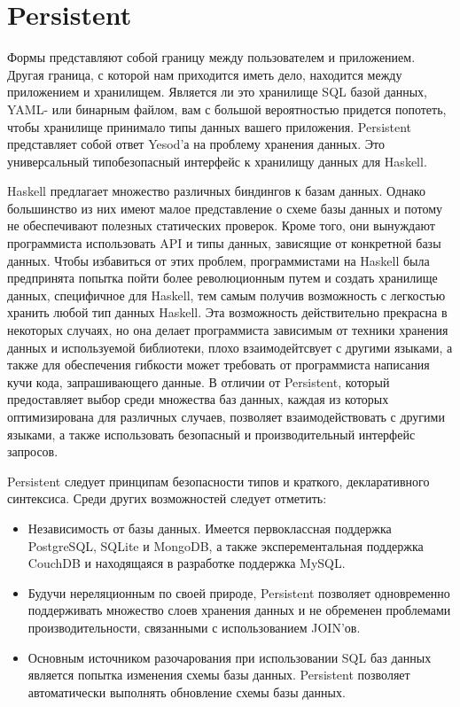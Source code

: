 \chapter{Persistent}\label{chap:persistent}

Формы представляют собой границу между пользователем и приложением. Другая граница, с которой нам приходится иметь дело, находится между приложением и хранилищем. Является ли это хранилище SQL базой данных, YAML- или бинарным файлом, вам с большой вероятностью придется попотеть, чтобы хранилище принимало типы данных вашего приложения. Persistent представляет собой ответ Yesod'а на проблему хранения данных. Это универсальный типобезопасный интерфейс к хранилищу данных для Haskell.

Haskell предлагает множество различных биндингов к базам данных. Однако большинство из них имеют малое представление о схеме базы данных и потому не обеспечивают полезных статических проверок. Кроме того, они вынуждают программиста использовать API и типы данных, зависящие от конкретной базы данных. Чтобы избавиться от этих проблем, программистами на Haskell была предпринята попытка пойти более революционным путем и создать хранилище данных, специфичное для Haskell, тем самым получив возможность с легкостью хранить любой тип данных Haskell. Эта возможность действительно прекрасна в некоторых случаях, но она делает программиста зависимым от техники хранения данных и используемой библиотеки, плохо взаимодейтсвует с другими языками, а также для обеспечения гибкости может требовать от программиста написания кучи кода, запрашивающего данные. В отличии от Persistent, который предоставляет выбор среди множества баз данных, каждая из которых оптимизирована для различных случаев, позволяет взаимодействовать с другими языками, а также использовать безопасный и производительный интерфейс запросов.

Persistent следует принципам безопасности типов и краткого, декларативного синтексиса. Среди других возможностей следует отметить:

\begin{itemize}
  \item Независимость от базы данных. Имеется первоклассная поддержка PostgreSQL, SQLite и MongoDB, а также эксперементальная поддержка CouchDB и находящаяся в разработке поддержка MySQL.
  \item Будучи нереляционным по своей природе, Persistent позволяет одновременно поддерживать множество слоев хранения данных и не обременен проблемами производительности, связанными с использованием JOIN'ов.
  \item Основным источником разочарования при использовании SQL баз данных является попытка изменения схемы базы данных. Persistent позволяет автоматически выполнять обновление схемы базы данных.
\end{itemize}

